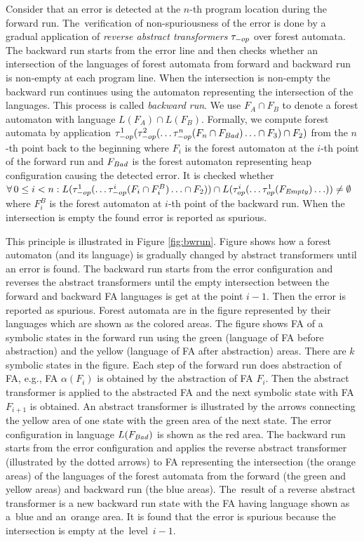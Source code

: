 Consider that an error is detected at the $n$-th program location
during the forward run.
The~verification of non-spuriousness of the error is done by a gradual application of
\emph{reverse abstract transformers} $\tau_{-op}$ over forest automata.
The backward run starts from the error line and
then checks whether an intersection of
the languages of forest automata from forward and backward run is non-empty
at each program line.
When the intersection is non-empty the backward run continues using the automaton
representing the intersection of the languages.
This process is called \emph{backward run}.
We use $F_A \cap F_B$ to denote a forest automaton with language $L(F_A) \cap L(F_B)$.
Formally, we compute forest automata by application
$\tau_{-op}^1(\tau_{-op}^{2}(\ldots \tau_{-op}^{n}(F_{n} \cap F_\mathit{Bad}) \ldots \cap F_{3}) \cap F_{2})$
from the $n$-th point back to the beginning
where $F_i$ is the forest automaton at the $i$-th point of the forward run
and $F_\mathit{Bad}$ is the forest automaton representing heap configuration causing the detected error.
It is checked whether $\forall\,0 \leq i < n: L(\tau_{-op}^1(\ldots \tau_{-op}^{i}(F_{i} \cap F^B_{i}) \ldots \cap F_2)) \cap
L(\tau_{op}^i(\ldots \tau_{op}^{1}(F_\mathit{Empty}) \ldots)) \neq \emptyset$
where $F_i^B$ is the forest automaton at $i$-th point of the backward run.
When the intersection is empty the found error is reported as spurious.

This principle is illustrated in Figure \ref{fig:bwrun}.
Figure shows how a forest automaton (and its language) is gradually changed
by abstract transformers until an error is found.
The backward run starts from the error configuration and reverses the abstract transformers
until the empty intersection between the forward and backward FA languages
is get at the point $i-1$.
Then the error is reported as spurious.
Forest automata are in the figure represented by their languages
which are shown as the colored areas.
The figure shows FA of a symbolic states in the forward run using the green (language of
FA before abstraction) and the yellow (language of FA after abstraction) areas.
There are $k$ symbolic states in the figure.
Each step of the forward run does abstraction of FA,
e.g., FA $\alpha(F_{i})$ is obtained by the abstraction of FA $F_i$.
Then the abstract transformer is applied to the abstracted FA
and the next symbolic state with FA $F_{i+1}$ is obtained.
An abstract transformer is illustrated by the arrows connecting
the yellow area of one state with the green area of the next state.
The error configuration in language $L(F_\mathit{Bad})$ is shown as the red area.
The backward run starts from the error configuration and applies the reverse abstract transformer
(illustrated by the dotted arrows) to FA representing the intersection
(the orange areas) of the languages of the forest automata
from the forward (the green and yellow areas) and backward run (the blue areas).
The~result of a reverse abstract transformer is a new backward run state
with the FA having language shown as a~blue and an~orange area.
It is found that the error is spurious because the intersection
is empty at the~level~$i-1$.


